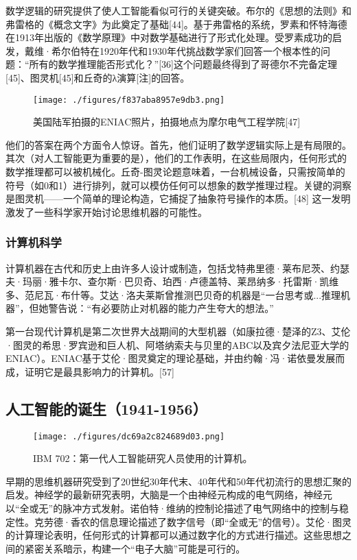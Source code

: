 数学逻辑的研究提供了使人工智能看似可行的关键突破。布尔的《思想的法则》和弗雷格的《概念文字》为此奠定了基础[44]。基于弗雷格的系统，罗素和怀特海德在1913年出版的《数学原理》中对数学基础进行了形式化处理。受罗素成功的启发，戴维·希尔伯特在1920年代和1930年代挑战数学家们回答一个根本性的问题：“所有的数学推理能否形式化？”[36]这个问题最终得到了哥德尔不完备定理[45]、图灵机[45]和丘奇的λ演算[注]的回答。
\begin{figure}[ht]
\centering
\texttt{[image: ./figures/f837aba8957e9db3.png]}
\caption{美国陆军拍摄的ENIAC照片，拍摄地点为摩尔电气工程学院[47]} \label{fig_RGZN_4}
\end{figure}
他们的答案在两个方面令人惊讶。首先，他们证明了数学逻辑实际上是有局限的。其次（对人工智能更为重要的是），他们的工作表明，在这些局限内，任何形式的数学推理都可以被机械化。丘奇-图灵论题意味着，一台机械设备，只需按简单的符号（如0和1）进行排列，就可以模仿任何可以想象的数学推理过程。关键的洞察是图灵机——一个简单的理论构造，它捕捉了抽象符号操作的本质。[48] 这一发明激发了一些科学家开始讨论思维机器的可能性。
\subsubsection{计算机科学}  
计算机器在古代和历史上由许多人设计或制造，包括戈特弗里德·莱布尼茨、约瑟夫·玛丽·雅卡尔、查尔斯·巴贝奇、珀西·卢德盖特、莱昂纳多·托雷斯·凯维多、范尼瓦·布什等。艾达·洛夫莱斯曾推测巴贝奇的机器是“一台思考或...推理机器”，但她警告说：“有必要防止对机器的能力产生夸大的想法。”  

第一台现代计算机是第二次世界大战期间的大型机器（如康拉德·楚泽的Z3、艾伦·图灵的希思·罗宾逊和巨人机、阿塔纳索夫与贝里的ABC以及宾夕法尼亚大学的ENIAC）。ENIAC基于艾伦·图灵奠定的理论基础，并由约翰·冯·诺依曼发展而成，证明它是最具影响力的计算机。[57]
\subsection{人工智能的诞生（1941-1956）}
\begin{figure}[ht]
\centering
\texttt{[image: ./figures/dc69a2c824689d03.png]}
\caption{IBM 702：第一代人工智能研究人员使用的计算机。} \label{fig_RGZN_5}
\end{figure}
早期的思维机器研究受到了20世纪30年代末、40年代和50年代初流行的思想汇聚的启发。神经学的最新研究表明，大脑是一个由神经元构成的电气网络，神经元以“全或无”的脉冲方式发射。诺伯特·维纳的控制论描述了电气网络中的控制与稳定性。克劳德·香农的信息理论描述了数字信号（即“全或无”的信号）。艾伦·图灵的计算理论表明，任何形式的计算都可以通过数字化的方式进行描述。这些思想之间的紧密关系暗示，构建一个“电子大脑”可能是可行的。

